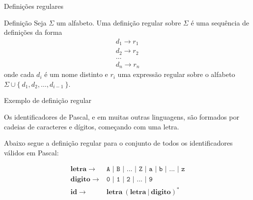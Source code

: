 \begin{frame}[fragile]{Definições regulares}

    \begin{block}{Definição}
        Seja $\Sigma$ um alfabeto. Uma definição regular sobre $\Sigma$ é uma sequência de definições da forma
        \[
            \begin{array}{l}
                d_1 \to r_1 \\
                d_2 \to r_2 \\
                \ldots \\
                d_n \to r_n
            \end{array}
        \]
    onde cada $d_i$ é um nome distinto e $r_i$ uma expressão regular sobre o alfabeto
    $\Sigma \cup \{\ d_1, d_2, \ldots, d_{i - 1}\ \}$.
    \end{block}

\end{frame}

\begin{frame}[fragile]{Exemplo de definição regular}

    Os identificadores de Pascal, e em muitas outras linguagens, são formados por cadeias de caracteres e dígitos, começando com uma letra.
    \pause

    \vspace{0.2in}
    Abaixo segue a definição regular para o conjunto de todos os identificadores válidos em Pascal:
    \pause

    \vspace{0.2in}
    \[
        \begin{array}{rl}
            \mathbf{letra}\to & \texttt{A | B | ... | Z | a | b | ... | z} \\
            \mathbf{digito}\to & \texttt{0 | 1 | 2 | ... | 9} \\
            \mathbf{id}\to & \mathbf{letra}\ (\mathbf{letra}\ |\ \mathbf{digito})^* 
        \end{array}
    \]

\end{frame}

